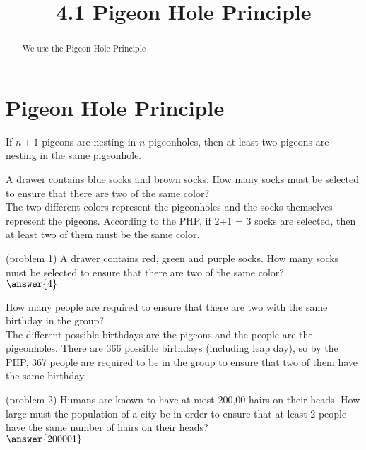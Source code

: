 \documentclass[handout]{ximera}
\title{4.1 Pigeon Hole Principle}
\begin{document}
\begin{abstract}
We use the Pigeon Hole Principle
\end{abstract}

\maketitle

\section{Pigeon Hole Principle}

\begin{proposition}
If $n+1$ pigeons are nesting in $n$ pigeonholes, then at least two pigeons are nesting in the same pigeonhole.
\end{proposition}

\begin{example}
A drawer contains blue socks and brown socks.  How many socks must be selected to ensure that there are two of the same color?\\
The two different colors represent the pigeonholes and the socks themselves represent the pigeons.  
According to the PHP, if 2+1 = 3 socks are selected, then at least two of them must be the same color.
\end{example}

\begin{problem}(problem 1)
A drawer contains red, green and purple socks. How many socks must be selected to ensure that there are two of the same color?\\
$\answer{4}$
\end{problem}


\begin{example}[example 2]
How many people are required to ensure that there are two with the same birthday in the group?\\
The different possible birthdays are the pigeons and the people are the pigeonholes.  
There are 366 possible birthdays (including leap day), so by the PHP, 367 people are required to be in the group to 
ensure that two of them have the same birthday.
\end{example}

\begin{problem}(problem 2)
Humans are known to have at most 200,00 hairs on their heads.  How large must the population of a city be in order to 
ensure that at least 2 people have the same number of hairs on their heads?\\
$\answer{200001}$
\end{problem}
\end{document}
